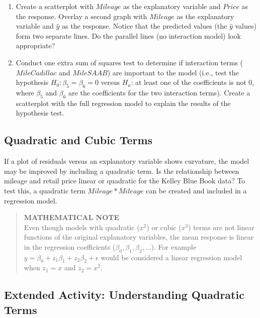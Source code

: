\documentclass[
]{report}
\providecommand{\tightlist}{%
  \setlength{\itemsep}{0pt}\setlength{\parskip}{0pt}}
\begin{document}
\begin{enumerate}
\def\labelenumi{\alph{enumi}.}
\tightlist
\item
  Create a scatterplot with \(Mileage\) as the explanatory variable and \(Price\) as the response. Overlay a second graph with \(Mileage\) as the explanatory variable and \(\hat y\) as the response. Notice that the predicted values (the \(\hat y\) values) form two separate lines. Do the parallel lines (no interaction model) look appropriate?
\item
  Conduct one extra sum of squares test to determine if interaction terms (\(MileCadillac\) and \(MileSAAB\)) are important to the model (i.e., test the hypothesis \(H_0: \beta_5 = \beta_6 = 0\) versus \(H_a\): at least one of the coefficients is not 0, where \(\beta_5\) and \(\beta_6\) are the coefficients for the two interaction terms). Create a scatterplot with the full regression model to explain the results of the hypothesis test.
\end{enumerate}

\subsection{Quadratic and Cubic Terms}\label{quadratic-and-cubic-terms}

If a plot of residuals versus an explanatory variable shows curvature, the model may be improved by including a quadratic term. Is the relationship between mileage and retail price linear or quadratic for the Kelley Blue Book data? To test this, a quadratic term \(Mileage*Mileage\) can be created and included in a regression model.

\begin{quote}
\textbf{MATHEMATICAL NOTE}\\
Even though models with quadratic (\(x^2\)) or cubic (\(x^3\)) terms are not linear functions of the original explanatory variables, the mean response is linear in the regression coefficients (\(\beta_0, \beta_1, \beta_2, \dots\)). For example \(y = \beta_0 + z_1 \beta_1 + z_2 \beta_2 + \epsilon\) would be considered a linear regression model when \(z_1 = x\) and \(z_2 = x^2\).
\end{quote}

\subsection*{Extended Activity: Understanding Quadratic Terms}\label{extended-activity-understanding-quadratic-terms}
\end{document}
